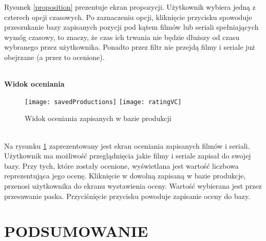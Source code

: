 \documentclass[12pt,oneside,a4paper]{report}
\begin{document}
Rysunek \ref{proposition} prezentuje ekran propozycji. Użytkownik wybiera jedną z czterech opcji czasowych. Po zaznaczeniu opcji, kliknięcie przycisku spowoduje przeszukanie bazy zapisanych pozycji pod kątem filmów lub seriali spełniających wymóg czasowy, to znaczy, że czas ich trwania nie będzie dłuższy od czasu wybranego przez użytkownika. Ponadto przez filtr nie przejdą filmy i seriale już obejrzane (a przez to ocenione). 
\pagebreak
\subparagraph{}\textbf{Widok oceniania}
\begin{figure}[ht!]
	\centering
	\subfloat[]{}
	\texttt{[image: savedProductions]}
	\quad
	\subfloat[]{}
	\texttt{[image: ratingVC]}
	\caption{Widok oceniania zapisanych w bazie produkcji}
	\label{rating}
\end{figure}\\
Na rysunku \ref{rating} zaprezentowany jest ekran oceniania zapisanych filmów i seriali. Użytkownik ma możliwość przeglądnięcia jakie filmy i seriale zapisał do swojej bazy. Przy tych, które zostały ocenione, wyświetlana jest wartość liczbowa reprezentująca jego ocenę. Kliknięcie w dowolną zapisaną w bazie produkcje, przenosi użytkownika do ekranu wystawienia oceny. Wartość wybierana jest przez przesuwanie paska. Przyciśnięcie przycisku powoduje zapisanie oceny do bazy. 
\chapter{PODSUMOWANIE}
\end{document}
